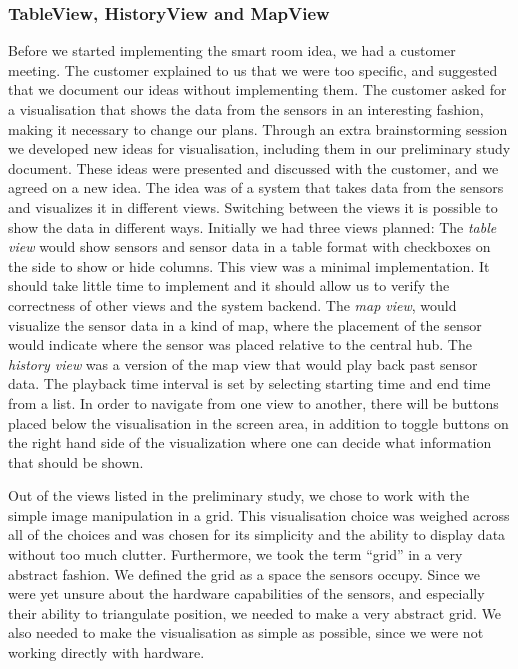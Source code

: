 \documentclass[../document.tex]{subfiles}
\begin{document}
\subsubsection{TableView, HistoryView and MapView}
Before we started implementing the smart room idea, we had a customer meeting. The customer explained to us that we were too specific, and suggested that we document our ideas without implementing them. The customer asked for a visualisation that shows the data from the sensors in an interesting fashion, making it necessary to change our plans. Through an extra brainstorming session we developed new ideas for visualisation, including them in our preliminary study document. These ideas were presented and discussed with the customer, and we agreed on a new idea. The idea was of a system that takes data from the sensors and visualizes it in different views. Switching between the views it is possible to show the data in different ways. Initially we had three views planned: The \emph{table view} would show sensors and sensor data in a table format with checkboxes on the side to show or hide columns.  This view was a minimal implementation. It should take little time to implement and it should allow us to verify the correctness of other views and the system backend. The \emph{map view}, would visualize the sensor data in a kind of map, where the placement of the sensor would indicate where the sensor was placed relative to the central hub. The \emph{history view} was a version of the map view that would play back past sensor data. The playback time interval is set by selecting starting time and end time from a list. In order to navigate from one view to another, there will be buttons placed below the visualisation in the screen area, in addition to toggle buttons on the right hand side of the visualization where one can decide what information that should be shown. 

Out of the views listed in the preliminary study, we chose to work with the simple image manipulation in a grid. This visualisation choice was weighed across all of the choices and was chosen for its simplicity and the ability to display data without too much clutter. Furthermore, we took the term “grid” in a very abstract fashion. We defined the grid as a space the sensors occupy. Since we were yet unsure about the hardware capabilities of the sensors, and especially their ability to triangulate position, we needed to make a very abstract grid. We also needed to make the visualisation as simple as possible, since we were not working directly with hardware.
\end{document}
